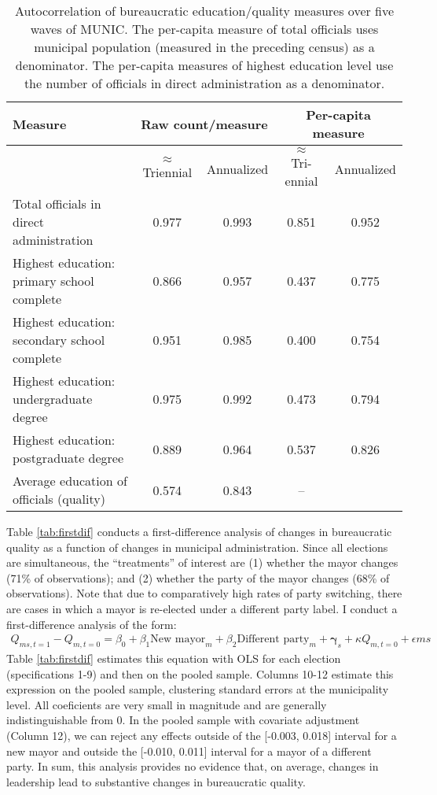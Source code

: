 \documentclass[11pt,english]{article}
\begin{document}
\begin{table}
\centering
\begin{tabular}{lcccc}
  \hline
Measure & \multicolumn{2}{c}{Raw count/measure} & \multicolumn{2}{c}{Per-capita measure} \\ 
  \hline & $\approx$ Triennial & Annualized & $\approx$ Tri-ennial & Annualized \\ 
Total officials in direct administration & 0.977 & 0.993 & 0.851 & 0.952 \\ 
  Highest education: primary school complete & 0.866 & 0.957 &0.437 & 0.775 \\ 
  Highest education: secondary school complete & 0.951 & 0.985& 0.400 & 0.754 \\ 
  Highest education: undergraduate degree & 0.975 &0.992 &0.473 & 0.794 \\ 
  Highest education: postgraduate degree & 0.889 & 0.964 &0.537 & 0.826 \\ 
  Average education of officials (quality) & 0.574 & 0.843&  -- \\ 
   \hline
\end{tabular}
\caption{Autocorrelation of bureaucratic education/quality measures over five waves of MUNIC. The per-capita measure of total officials uses municipal population (measured in the preceding census) as a denominator. The per-capita measures of highest education level use the number of officials in direct administration as a denominator.}\label{tab:autocorr}
\end{table}


Table \ref{tab:firstdif} conducts a first-difference analysis of changes in bureaucratic quality as a function of changes in municipal administration. Since all elections are simultaneous, the ``treatments'' of interest are (1) whether the mayor changes (71\% of observations); and (2) whether the party of the mayor changes (68\% of observations). Note that due to comparatively high rates of party switching, there are cases in which a mayor is re-elected under a different party label. I conduct a first-difference analysis of the form:
\begin{align*}
Q_{ms,t=1}-Q_{m,t=0} = \beta_0 + \beta_1 \text{New mayor}_m + \beta_2\text{Different party}_m + \boldsymbol{\gamma}_s + \kappa Q_{m, t=0} + \epsilon{ms}
\end{align*}
Table \ref{tab:firstdif} estimates this equation with OLS for each election (specifications 1-9) and then on the pooled sample. Columns 10-12 estimate this expression on the pooled sample, clustering standard errors at the municipality level. All coeficients are very small in magnitude and are generally indistinguishable from 0. In the pooled sample with covariate adjustment (Column 12), we can reject any effects outside of the [-0.003, 0.018] interval for a new mayor and outside the [-0.010, 0.011] interval for a mayor of a different party. In sum, this analysis provides no evidence that, on average, changes in leadership lead to substantive changes in bureaucratic quality.\\
\end{document}
